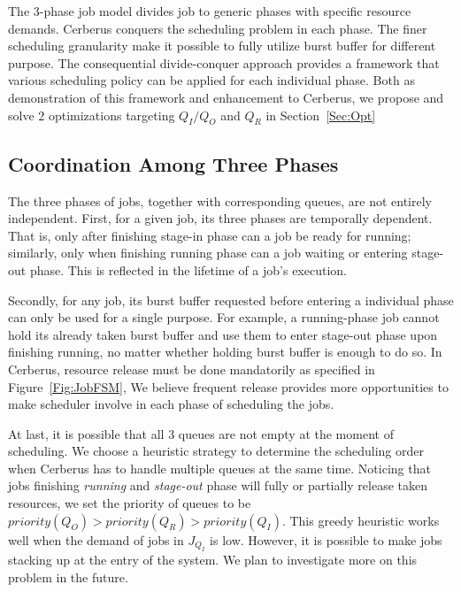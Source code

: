 The 3-phase job model divides job to generic phases with specific resource demands.
Cerberus conquers the scheduling problem in each phase.
The finer scheduling granularity make it possible to fully utilize burst buffer for different purpose.
The consequential divide-conquer approach provides a framework that various scheduling
policy can be applied for each individual phase.
Both as demonstration of this framework and enhancement to Cerberus,
we propose and solve 2 optimizations targeting $Q_I/Q_O$ and $Q_R$ in Section~\ref{Sec:Opt}

\subsection{Coordination Among Three Phases}
The three phases of jobs, together with corresponding queues, are not entirely independent.
First, for a given job, its three phases are temporally dependent.
That is, only after finishing stage-in phase can a job be ready for running;
similarly, only when finishing running phase can a job waiting or entering stage-out phase.
This is reflected in the lifetime of a job's execution.

Secondly, for any job,
its burst buffer requested before entering a individual phase can only be used for a single purpose.
For example, a running-phase job cannot hold its already taken burst buffer
and use them to enter stage-out phase upon finishing running,
no matter whether holding burst buffer is enough to do so.
In Cerberus, resource release must be done mandatorily as specified in Figure~\ref{Fig:JobFSM},
We believe frequent release provides more opportunities to make
scheduler involve in each phase of scheduling the jobs.

At last, it is possible that all 3 queues are not empty at the moment of scheduling.
We choose a heuristic strategy to determine the scheduling order when
Cerberus has to handle multiple queues at the same time.
Noticing that jobs finishing \textit{running} and \textit{stage-out} phase
will fully or partially release taken resources,
we set the priority of queues to be $priority(Q_O) > priority(Q_R) > priority(Q_I)$.
This greedy heuristic works well when the demand of jobs in $J_{Q_I}$ is low.
However, it is possible to make jobs stacking up at the entry of the system.
We plan to investigate more on this problem in the future.


